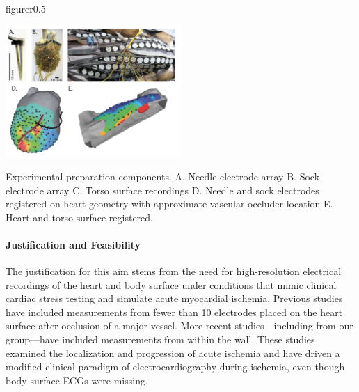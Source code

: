 \begin{wrapfloat}{figure}{r}{0.5\textwidth}
    \vspace{-.3in}
    \begin{center}
        {\includegraphics[width=0.5\textwidth]
          {Figures/fig1.png}}
        \captionsetup{width = 0.5\textwidth}
        \caption{\small \label{fig:prep} Experimental preparation
          components. A. Needle electrode array B. Sock electrode array
          C. Torso surface recordings D. Needle and sock electrodes
          registered on heart geometry with approximate vascular occluder
          location E. Heart and torso surface registered.}
    \end{center}
    \vspace{-.4in}
\end{wrapfloat}

\paragraph{Justification and Feasibility} The justification for this aim
stems from the need for high-resolution electrical recordings of the heart
and body surface under conditions that mimic clinical cardiac stress
testing and simulate acute myocardial ischemia.  Previous studies have
included measurements from fewer than 10 electrodes placed on the heart
surface after occlusion of a major
vessel.\cite{BMB:Hol77a,BMB:Hol77b,BLZ:Kle1978,BLZ:Jan1980} More recent
studies---including from our group---have included measurements from within
the wall.\cite{RSM:Cha89,RSM:Mac95e,RSM:Mac97} These studies
examined the localization and progression of acute ischemia and have
driven a modified clinical paradigm of electrocardiography during ischemia, even
though body-surface ECGs were missing.


